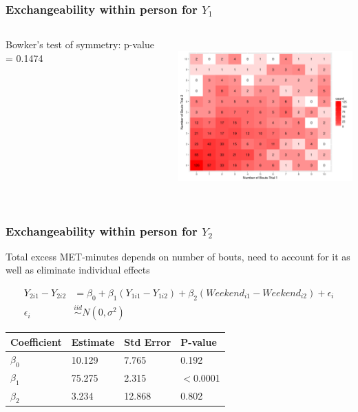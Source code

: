 \documentclass[handout]{beamer}\usepackage[]{graphicx}\usepackage[]{color}
\begin{document}
\begin{frame}
\frametitle{Exchangeability within person for $Y_1$}
\begin{columns}
\begin{column}{0.3\textwidth}
Bowker's test of symmetry: p-value = 0.1474
\end{column}
\begin{column}{0.7\textwidth}
\includegraphics[height=6cm, width=8cm]{y1exch}
\end{column}
\end{columns}

\end{frame}



\begin{frame}
\frametitle{Exchangeability within person for $Y_2$}
Total excess MET-minutes depends on number of bouts, need to account for it as well as eliminate individual effects

\begin{align*}
Y_{2i1}-Y_{2i2} &= \beta_0 + \beta_1(Y_{1i1}-Y_{1i2}) + \beta_2(Weekend_{i1}-Weekend_{i2}) + \epsilon_i \\
\epsilon_i &\overset{iid}{\sim} N(0,\sigma^2)
\end{align*}

\begin{table}[!htbp] \centering 
\begin{tabular}{l|lll}
\hline
Coefficient & Estimate & Std Error & P-value \\
\hline
$\beta_0$ & 10.129 & 7.765 & 0.192 \\
$\beta_1$ & 75.275 & 2.315 & $<$0.0001 \\
$\beta_2$ & 3.234 & 12.868 & 0.802 \\
\hline
\end{tabular} 
\end{table} 



\end{frame}
\end{document}
